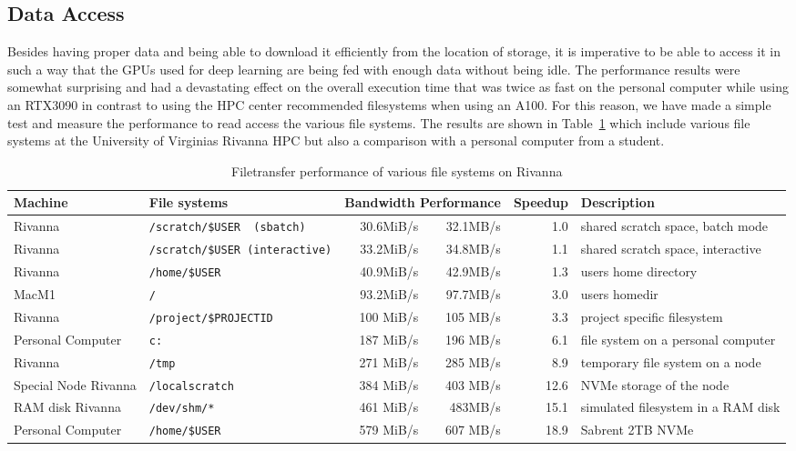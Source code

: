 \documentclass[utf8]{FrontiersinVancouver} %
\begin{document}
{\subsection{Data Access}

Besides having proper data and being able to download it efficiently
from the location of storage, it is imperative to be able to access it
in such a way that the GPUs used for deep learning are being fed with
enough data without being idle. The performance results were somewhat
surprising and had a devastating effect on the overall execution time
that was twice as fast on the personal computer while using an RTX3090
in contrast to using the HPC center recommended filesystems when using
an A100. For this reason, we have made a simple test and measure the
performance to read access the various file systems. The results are
shown in Table~\ref{tab:file-performance} which include various file
systems at the University of Virginias Rivanna HPC but also a
comparison with a personal computer from a student.

\begin{table}[htb]
  \caption{Filetransfer performance of various file systems on Rivanna}
  \label{tab:file-performance}
  \begin{center}
  {\footnotesize 
  \begin{tabular}{llrrrp{4.5cm}}
    Machine & File systems & \multicolumn{2}{l}{Bandwidth Performance} & Speedup & Description \\
    \hline
    Rivanna & \verb|/scratch/$USER  (sbatch)|     & 30.6MiB/s & 32.1MB/s  & 1.0 & shared scratch space, batch mode \\
    Rivanna & \verb|/scratch/$USER (interactive)| & 33.2MiB/s &  34.8MB/s  & 1.1 & shared scratch space, interactive \\
    Rivanna & \verb|/home/$USER|                    & 40.9MiB/s & 42.9MB/s  & 1.3 & users home directory \\
    MacM1   & \verb|/| & 93.2MiB/s & 97.7MB/s & 3.0 & users homedir \\
    Rivanna & \verb|/project/$PROJECTID |     & 100 MiB/s  & 105 MB/s  & 3.3 & project specific filesystem \\
    Personal Computer  & \verb|c:| & 187 MiB/s  & 196 MB/s  & 6.1 &  file system on a personal computer \\
    Rivanna & \verb|/tmp|                         & 271 MiB/s  & 285 MB/s  & 8.9 & temporary file system on a node \\
    \hline
    Special Node Rivanna & \verb|/localscratch|  &  384 MiB/s & 403 MB/s  & 12.6 & NVMe storage of the node\\
    RAM disk Rivanna  & \verb|/dev/shm/*|      &             461 MiB/s & 483MB/s  & 15.1 & simulated filesystem in a RAM disk\\
    Personal Computer & \verb|/home/$USER| & 579 MiB/s & 607 MB/s &  18.9 & Sabrent 2TB NVMe\\
    \hline                                             
    \end{tabular}
  }
    \end{center}
  \end{table}
  


}
\end{document}
